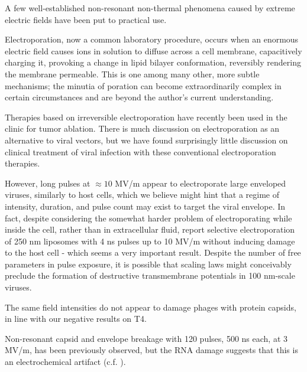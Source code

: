 \documentclass[paper.tex]{subfiles}
\begin{document}
\begin{multicols}{1}


A few well-established non-resonant non-thermal phenomena caused by extreme electric fields have been put to practical use.

Electroporation\cite{Electroporation1988}, now a common laboratory procedure, occurs when an enormous electric field causes ions in solution to diffuse across a cell membrane, capacitively charging it, provoking a change in lipid bilayer conformation\cite{Membrane2016}, reversibly rendering the membrane permeable. This is one among many other, more subtle mechanisms; the minutia of poration can become extraordinarily complex in certain circumstances and are beyond the author's current understanding\cite{Theoretical2007}. 

Therapies based on irreversible electroporation\cite{Nonthermal2013}\cite{Lipid2017} have recently been used in the clinic\cite{Irreversible2013} for tumor ablation. There is much discussion on electroporation as an alternative to viral vectors, but we have found surprisingly little discussion on clinical treatment of viral infection with these conventional electroporation therapies.

However, long pulses at $\approx10$ MV/m appear to electroporate large enveloped viruses, similarly to host cells\cite{AC2017}, which we believe might hint that a regime of intensity, duration, and pulse count may exist to target the viral envelope. In fact, despite considering the somewhat harder problem of electroporating while inside the cell, rather than in extracellular fluid, \cite{Electroporation2013} report selective electroporation of 250 nm liposomes with 4 ns pulses up to 10 MV/m without inducing damage to the host cell - which seems a very important result. Despite the number of free parameters in pulse exposure, it is possible that scaling laws might conceivably preclude the formation of destructive transmembrane potentials in 100 nm-scale viruses.

The same field intensities do not appear to damage phages with protein capsids\cite{Manipulation2013}, in line with our negative results on T4.

Non-resonant capsid and envelope breakage with 120 pulses, 500 ns each, at 3 MV/m, has been previously observed\cite{Inactivation1990}, but the RNA damage suggests that this is an electrochemical artifact \cite{Formation1996} (c.f. \cite{Microwave1987}). 


\end{multicols}
\end{document}
